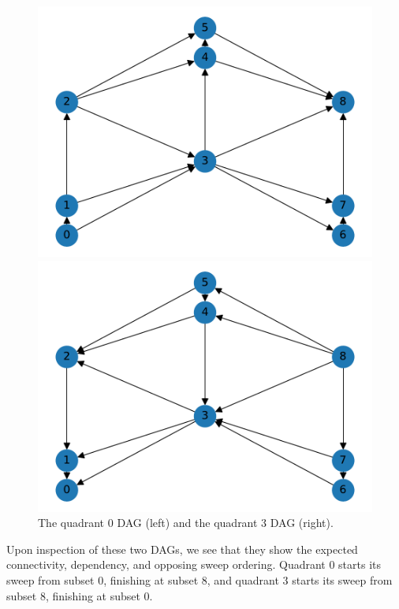 \begin{figure}[H]
\begin{minipage}[c]{0.5\textwidth}
\includegraphics[scale=0.5]{../../figures/9_graph0.pdf}
\end{minipage}
\begin{minipage}[c]{0.5\textwidth}
\includegraphics[scale=0.5]{../../figures/9_graph3.pdf}
\end{minipage}
\caption{The quadrant 0 DAG (left) and the quadrant 3 DAG (right).}
\label{25_q0q3graphs}
\end{figure}
Upon inspection of these two DAGs, we see that they show the expected connectivity, dependency, and opposing sweep ordering.
Quadrant 0 starts its sweep from subset 0, finishing at subset 8, and quadrant 3 starts its sweep from subset 8, finishing at subset 0.

